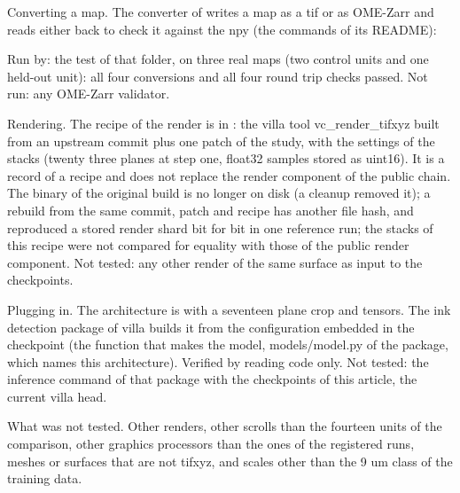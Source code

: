 Converting a map. The converter of \UsageDirConvert{} writes a map as a tif or as OME-Zarr and reads either back to check it against the npy (the commands of its README):



Run by: the test of that folder, on three real maps (two control units and one held-out unit): all four conversions and all four round trip checks passed. Not run: any OME-Zarr validator.

Rendering. The recipe of the render is in \UsageDirRender{}: the villa tool vc\_render\_tifxyz built from an upstream commit plus one patch of the study, with the settings of the stacks (twenty three planes at step one, float32 samples stored as uint16). It is a record of a recipe and does not replace the render component of the public chain. The binary of the original build is no longer on disk (a cleanup removed it); a rebuild from the same commit, patch and recipe has another file hash, and reproduced a stored render shard bit for bit in one reference run; the stacks of this recipe were not compared for equality with those of the public render component. Not tested: any other render of the same surface as input to the checkpoints.

Plugging in. The architecture is \texttt{\UsageArch{}} with a seventeen plane crop and \UsageTensors{} tensors. The ink detection package of villa builds it from the configuration embedded in the checkpoint (the function that makes the model, models/model.py of the package, which names this architecture). Verified by reading code only. Not tested: the inference command of that package with the checkpoints of this article, the current villa head.

What was not tested. Other renders, other scrolls than the fourteen units of the comparison, other graphics processors than the ones of the registered runs, meshes or surfaces that are not tifxyz, and scales other than the 9 um class of the training data.
